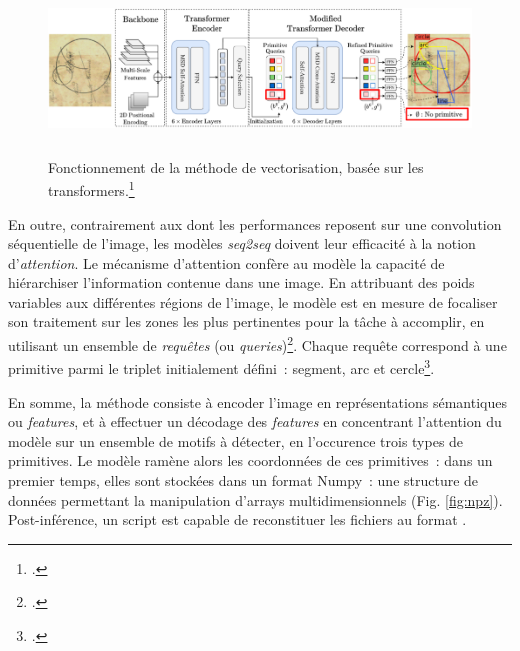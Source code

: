           \begin{figure}[H]
          \begin{center}
          \includegraphics[height=4.5cm]{figues/transformers.png}
          \end{center}
          \caption{Fonctionnement de la méthode de vectorisation, basée sur les transformers.\footcite{kalleli_historical_2024}}
          \label{fig:vectorisation} \end{figure}

En outre, contrairement aux \cnns dont les performances reposent sur une
convolution séquentielle de l'image, les modèles \textit{seq2seq} doivent leur
efficacité à la notion d'\emph{attention}. Le mécanisme d'attention
confère au modèle la capacité de hiérarchiser l'information contenue
dans une image. En attribuant des poids variables aux différentes
régions de l'image, le modèle est en mesure de focaliser son traitement
sur les zones les plus pertinentes pour la tâche à accomplir, en
utilisant un ensemble de \emph{requêtes} (ou \emph{queries})\footcite[p.95]{charniak_introduction_2021}. Chaque requête correspond à une primitive parmi le triplet
initialement défini~: segment, arc et cercle\footcite{noauthor_eida_nodate}.

En somme, la méthode consiste à encoder l'image en représentations
sémantiques ou \emph{features}, et à effectuer un décodage des
\emph{features} en concentrant l'attention du modèle sur un ensemble de
motifs à détecter, en l'occurence trois types de primitives. Le modèle
ramène alors les coordonnées de ces primitives~: dans un premier temps,
elles sont stockées dans un format Numpy~: une structure de données
permettant la manipulation d'arrays multidimensionnels (Fig. \ref{fig:npz}). Post-inférence,
un script est capable de reconstituer les fichiers \svg au format \xml.


